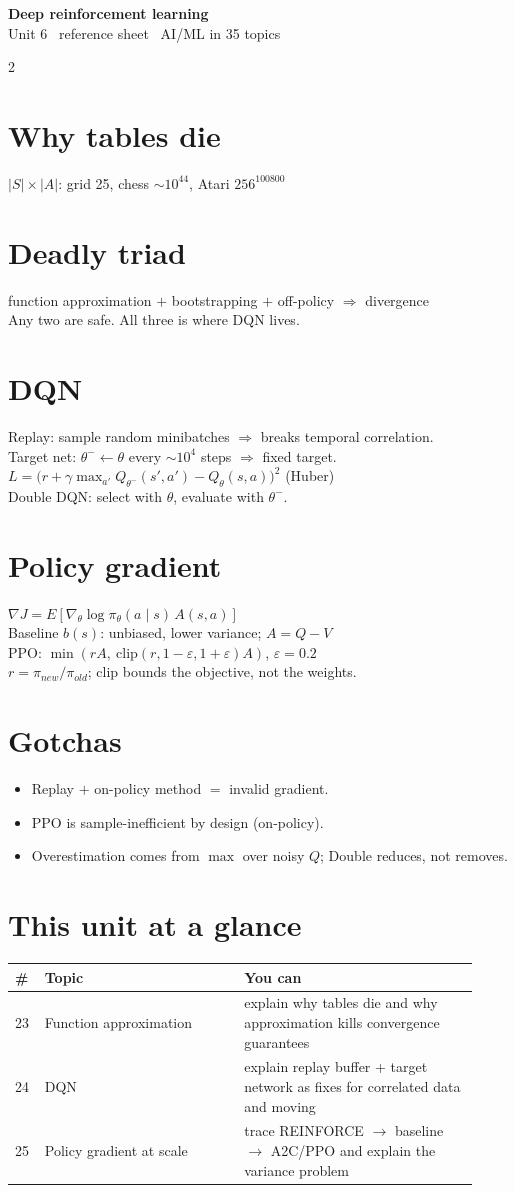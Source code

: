 \documentclass[11pt,a4paper]{article}
\newcommand{\sect}[1]{\section*{#1}}
\newcommand{\hd}[2]{\begin{center}{\large\bfseries #1}\\[-0.1em]{\small\color{gray}#2}\end{center}\vspace{-0.6em}}
\begin{document}
\hd{Deep reinforcement learning}{Unit 6 \textperiodcentered\ reference sheet \textperiodcentered\ AI/ML in 35 topics}
\begin{multicols}{2}
\normalsize

\sect{Why tables die}
$|S|\times|A|$: grid 25, chess $\sim10^{44}$, Atari $256^{100800}$

\sect{Deadly triad}
function approximation $+$ bootstrapping $+$ off-policy $\Rightarrow$ divergence\\
Any two are safe. All three is where DQN lives.

\sect{DQN}
Replay: sample random minibatches $\Rightarrow$ breaks temporal correlation.\\
Target net: $\theta^-\leftarrow\theta$ every $\sim10^4$ steps $\Rightarrow$ fixed target.\\
$L=\big(r+\gamma\max_{a'}Q_{\theta^-}(s',a')-Q_\theta(s,a)\big)^2$ (Huber)\\
Double DQN: select with $\theta$, evaluate with $\theta^-$.

\sect{Policy gradient}
$\nabla J=E[\nabla_\theta\log\pi_\theta(a\mid s)\,A(s,a)]$\\
Baseline $b(s)$: unbiased, lower variance; $A=Q-V$\\
PPO: $\min(rA,\ \mathrm{clip}(r,1-\varepsilon,1+\varepsilon)A)$, $\varepsilon=0.2$\\
$r=\pi_{new}/\pi_{old}$; clip bounds the objective, not the weights.

\sect{Gotchas}
\begin{itemize}
\item Replay $+$ on-policy method $=$ invalid gradient.
\item PPO is sample-inefficient by design (on-policy).
\item Overestimation comes from $\max$ over noisy $Q$; Double reduces, not removes.
\end{itemize}

\sect{This unit at a glance}
\begin{tabular}{@{}p{0.05\linewidth}p{0.40\linewidth}p{0.47\linewidth}@{}}
\toprule
\# & Topic & You can\\
\midrule
23 & Function approximation & explain why tables die and why approximation kills convergence guarantees\\
24 & DQN & explain replay buffer + target network as fixes for correlated data and moving\\
25 & Policy gradient at scale & trace REINFORCE $\rightarrow$ baseline $\rightarrow$ A2C/PPO and explain the variance problem\\
\bottomrule
\end{tabular}


\end{multicols}
\end{document}
